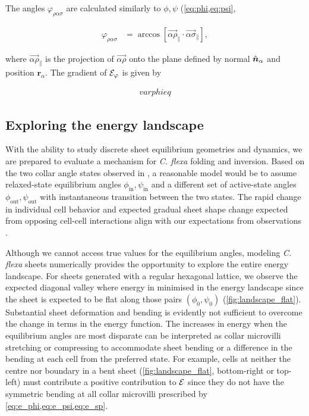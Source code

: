 The angles $\varphi_{\rho\alpha\sigma}$ are calculated similarly to $\phi, \psi$ (\cref{eq:phi,eq:psi},

\begin{align}
	\varphi_{\rho\alpha\sigma} &= \arccos \left[\vec{\alpha\rho}_\| \cdot \vec{\alpha\sigma}_\| \right], \label{eq:varphi}
\end{align}

\noindent where $\vec{\alpha\rho}_\|$ is the projection of $\vec{\alpha\rho}$ onto the plane defined by normal $\hat{\bm{n}}_\alpha$ and position $\bm{r}_\alpha$. 
The gradient of $\mathcal{E}_\varphi$ is given by 

\begin{align}
	varphi eq \label{eq:grad_varphi}
\end{align}

\subsection{Exploring the energy landscape}

With the ability to study discrete sheet equilibrium geometries and dynamics, we are prepared to evaluate a mechanism for \textit{C. flexa} folding and inversion. 
Based on the two collar angle states observed in \citet{brunet2019}, a reasonable model would be to assume relaxed-state equilibrium angles $\phi_{\text{in}}, \psi_{\text{in}}$ and a different set of active-state angles $\phi_{\text{out}}, \psi_{\text{out}}$ with instantaneous transition between the two states. 
The rapid change in individual cell behavior and expected gradual sheet shape change expected from opposing cell-cell interactions align with our expectations from observations \citet{brunet2019}. 

Although we cannot access true values for the equilibrium angles, modeling \textit{C. flexa} sheets numerically provides the opportunity to explore the entire energy landscape. 
For sheets generated with a regular hexagonal lattice, we observe the expected diagonal valley where energy in minimised in the energy landscape since the sheet is expected to be flat along those pairs $(\phi_0, \psi_0)$ (\cref{fig:landscape_flat}).
Substantial sheet deformation and bending is evidently not sufficient to overcome the change in terms in the energy function. 
The increases in energy when the equilibrium angles are most disparate can be interpreted as collar microvilli stretching or compressing to accommodate sheet bending or a difference in the bending at each cell from the preferred state. 
For example, cells at neither the centre nor boundary in a bent sheet (\cref{fig:landscape_flat}, bottom-right or top-left) must contribute a positive contribution to $\mathcal{E}$ since they do not have the symmetric bending at all collar microvilli prescribed by \cref{eq:e_phi,eq:e_psi,eq:e_sp}.

